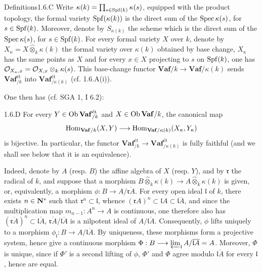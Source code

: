 \begin{enoncerm}{Definitions}{1.6.C}\label{VIIB.1.6.C}
Write $\kappa(k)=\prod_{s\in\Spf(k)}\kappa(s)$, equipped with the product topology, \ie the formal variety $\Spf(\kappa(k))$ is the direct sum of the $\Spec\kappa(s)$, for $s\in\Spf(k)$. Moreover, denote by $S_{\kappa(k)}$ the scheme which is the direct sum of the $\Spec\kappa(s)$, for $s\in\Spf(k)$.
For every formal variety $X$ over $k$, denote by $X_\kappa=X\widehat\otimes_k\kappa(k)$ the formal variety over $\kappa(k)$ obtained by base change, \ie $X_\kappa$ has the same points as $X$ and for every $x\in X$ projecting to $s$ on $\Spf(k)$, one has $\OO_{X_\kappa,x}=\OO_{X,x}\otimes_k\kappa(s)$. This base-change functor $\mathbf{Vaf}/k\to\mathbf{Vaf}/\kappa(k)$ sends $\mathbf{Vaf}_{/k}^{\text{ét}}$ into $\mathbf{Vaf}_{/\kappa(k)}^{\text{ét}}$ (cf. 1.6.A(i)).
\end{enoncerm}
One then has (cf. SGA 1, I 6.2):
\begin{lemma}{1.6.D}\label{VIIB.1.6.D}
For every $Y\in\Ob\mathbf{Vaf}_{/k}^{\text{ét}}$ and $X\in\Ob\mathbf{Vaf}/k$, the canonical map
\[
\Hom_{\mathbf{Vaf}/k}(X,Y)\to\Hom_{\mathbf{Vaf}/\kappa(k)}(X_\kappa,Y_\kappa)
\]
is bijective. In particular, the functor $\mathbf{Vaf}_{/k}^{\text{ét}}\to\mathbf{Vaf}_{/\kappa(k)}^{\text{ét}}$ is fully faithful (and we shall see below that it is an equivalence).
\end{lemma}
Indeed, denote by $A$ (resp. $B$) the affine algebra of $X$ (resp. $Y$), and by $\mathfrak r$ the radical of $k$, and suppose that a morphism $B\widehat\otimes_k\kappa(k)\to A\widehat\otimes_k\kappa(k)$ is given, or, equivalently, a morphism $\phi:B\to A/\overline{\mathfrak rA}$.
For every open ideal $\mathfrak l$ of $k$, there exists $n\in\NN^*$ such that $\mathfrak r^n\subset\mathfrak l$, whence $(\mathfrak rA)^n\subset\mathfrak lA\subset\overline{\mathfrak lA}$, and since the multiplication map $m_{n-1}:A^n\to A$ is continuous, one therefore also has $(\overline{\mathfrak rA})^n\subset\overline{\mathfrak lA}$, \ie $\overline{\mathfrak rA}/\overline{\mathfrak lA}$ is a nilpotent ideal of $A/\overline{\mathfrak lA}$. Consequently, $\phi$ lifts uniquely to a morphism $\phi_{\mathfrak l}:B\to A/\overline{\mathfrak lA}$. By uniqueness, these morphisms form a projective system, hence give a continuous morphism $\Phi:B\to\varprojlim_{\mathfrak l}A/\overline{\mathfrak lA}=A$. Moreover, $\Phi$ is unique, since if $\Phi'$ is a second lifting of $\phi$, $\Phi'$ and $\Phi$ agree modulo $\overline{\mathfrak lA}$ for every $\mathfrak l$, hence are equal.

